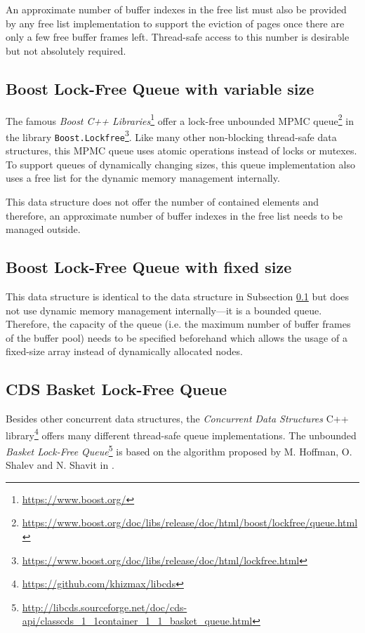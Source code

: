     An approximate number of buffer indexes in the free list must also be provided by any free list implementation to support the eviction of pages once there are only a few free buffer frames left. Thread-safe access to this number is desirable but not absolutely required.

\subsection[Boost Lock-Free Queue with variable size]{Boost Lock-Free Queue with variable size} \label{subsec:boost}

    The famous \textit{Boost C++ Libraries}\footnote{\url{https://www.boost.org/}} offer a lock-free unbounded MPMC queue\footnote{\url{https://www.boost.org/doc/libs/release/doc/html/boost/lockfree/queue.html}} in the library \lstinline{Boost.Lockfree}\footnote{\url{https://www.boost.org/doc/libs/release/doc/html/lockfree.html}}. Like many other non-blocking thread-safe data structures, this MPMC queue uses atomic operations instead of locks or mutexes. To support queues of dynamically changing sizes, this queue implementation also uses a free list for the dynamic memory management internally.

    This data structure does not offer the number of contained elements and therefore, an approximate number of buffer indexes in the free list needs to be managed outside.

\subsection[Boost Lock-Free Queue with fixed size]{Boost Lock-Free Queue with fixed size} \label{subsec:boost-fixed}

    This data structure is identical to the data structure in Subsection \ref{subsec:boost} but does not use dynamic memory management internally---it is a bounded queue. Therefore, the capacity of the queue (i.e. the maximum number of buffer frames of the buffer pool) needs to be specified beforehand which allows the usage of a fixed-size array instead of dynamically allocated nodes.

\subsection[CDS BasketQueue]{CDS Basket Lock-Free Queue} \label{subsec:cds-basket}

    Besides other concurrent data structures, the \textit{Concurrent Data Structures} C++ library\footnote{\url{https://github.com/khizmax/libcds}} offers many different thread-safe queue implementations. The unbounded \emph{Basket Lock-Free Queue}\footnote{\url{http://libcds.sourceforge.net/doc/cds-api/classcds\_1\_1container\_1\_1\_basket\_queue.html}} is based on the algorithm proposed by M. Hoffman, O. Shalev and N. Shavit in \cite{Hoffman:2007}.


